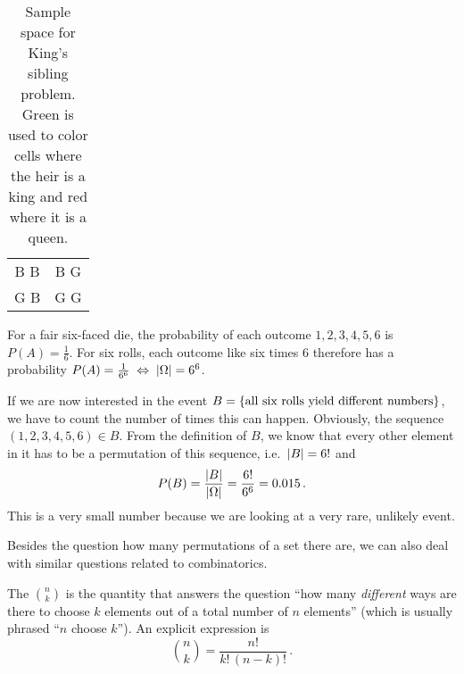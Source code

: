 \begin{table}
\centering

\begin{tabular}{c c}

\cellcolor{green!36} B B & \cellcolor{green!36} B G \\

\cellcolor{green!36} G B & \cellcolor{red!36} G G \\

\end{tabular}

\caption{Sample space for King's sibling problem. Green is used to color cells where the heir is a king and red where it is a queen.}
\label{tab:ss_king_sibling}
\end{table}


\begin{ex}
For a fair six-faced die, the probability of each outcome $1, 2, 3, 4, 5, 6$ is $P(A) = \frac{1}{6}$. For six rolls, each outcome like six times $6$ therefore has a probability $P(A) = \frac{1}{6^6} \; \Leftrightarrow \; \abs{\Omega} = 6^6$.

If we are now interested in the event $B = \qty{\text{all six rolls yield different numbers}}$, we have to count the number of times this can happen. Obviously, the sequence $(1, 2, 3, 4, 5, 6) \in B$. From the definition of $B$, we know that every other element in it has to be a permutation of this sequence, i.e.~$\abs{B} = 6!$ and
\begin{equation*}
P(B) = \frac{\abs{B}}{\abs{\Omega}} = \frac{6!}{6^6} = 0.015 \, .
\end{equation*}
This is a very small number because we are looking at a very rare, unlikely event.
\end{ex}


Besides the question how many permutations of a set there are, we can also deal with similar questions related to combinatorics.


\begin{defi}
The  $\binom{n}{k}$ is the quantity that answers the question \enquote{how many \emph{different} ways are there to choose $k$ elements out of a total number of $n$ elements} (which is usually phrased \enquote{$n$ choose $k$}). An explicit expression is
\begin{equation}
\binom{n}{k} = \frac{n!}{k! \, (n - k)!} \, .
\end{equation}
\end{defi}

